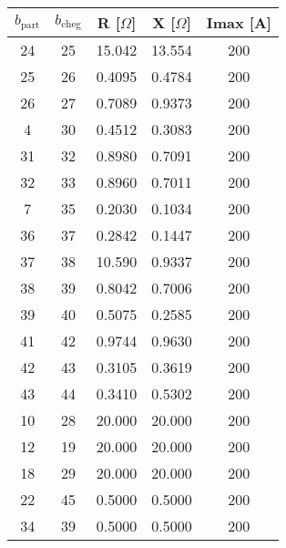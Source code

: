 \begin{table}[H]
\begin{minipage}{.5\linewidth}
    \end{minipage}%
    \begin{minipage}{.5\linewidth}
        \centering
        \begin{tabular}{|c|c|c|c|c|}
        \hline
        $b_\text{part}$ & $b_\text{cheg}$& R [$\Omega$]  & X [$\Omega$] & Imax [A]\\ \hline    
        24 & 25 & 15.042 & 13.554 & 200\\ \hline
        25 & 26 & 0.4095 & 0.4784 & 200\\ \hline
        26 & 27 & 0.7089 & 0.9373 & 200\\ \hline
         4 & 30 & 0.4512 & 0.3083 & 200\\ \hline
        31 & 32 & 0.8980 & 0.7091 & 200\\ \hline
        32 & 33 & 0.8960 & 0.7011 & 200\\ \hline
         7 & 35 & 0.2030 & 0.1034 & 200\\ \hline
        36 & 37 & 0.2842 & 0.1447 & 200\\ \hline
        37 & 38 & 10.590 & 0.9337 & 200\\ \hline
        38 & 39 & 0.8042 & 0.7006 & 200\\ \hline
        39 & 40 & 0.5075 & 0.2585 & 200\\ \hline
        41 & 42 & 0.9744 & 0.9630 & 200\\ \hline
        42 & 43 & 0.3105 & 0.3619 & 200\\ \hline
        43 & 44 & 0.3410 & 0.5302 & 200\\ \hline
        10 & 28 & 20.000 & 20.000 & 200\\ \hline
        12 & 19 & 20.000 & 20.000 & 200\\ \hline
        18 & 29 & 20.000 & 20.000 & 200\\ \hline
        22 & 45 & 0.5000 & 0.5000 & 200\\ \hline
        34 & 39 & 0.5000 & 0.5000 & 200\\ \hline
        \end{tabular}
    \end{minipage} 
\end{table}